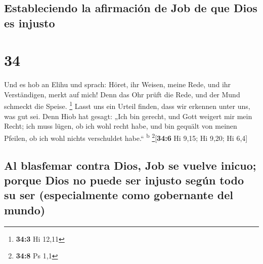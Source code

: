 \hypertarget{estableciendo-la-afirmaciuxf3n-de-job-de-que-dios-es-injusto}{%
\subsection{Estableciendo la afirmación de Job de que Dios es
injusto}\label{estableciendo-la-afirmaciuxf3n-de-job-de-que-dios-es-injusto}}

\hypertarget{section-33}{%
\section{34}\label{section-33}}

 Und es hob an Elihu und sprach:  Höret, ihr
Weisen, meine Rede, und ihr Verständigen, merkt auf mich! 
Denn das Ohr prüft die Rede, und der Mund schmeckt die Speise.
\footnote{\textbf{34:3} Hi 12,11}  Lasst uns ein Urteil
finden, dass wir erkennen unter uns, was gut sei.  Denn
Hiob hat gesagt: „Ich bin gerecht, und Gott weigert mir mein Recht;
 ich muss lügen, ob ich wohl recht habe, und bin gequält
von meinen Pfeilen, ob ich wohl nichts verschuldet habe.``
\textsuperscript{b} \footnote{\textbf{34:8} Ps 1,1}{[}\textbf{34:6} Hi
9,15; Hi 9,20; Hi 6,4{]}

\hypertarget{al-blasfemar-contra-dios-job-se-vuelve-inicuo-porque-dios-no-puede-ser-injusto-seguxfan-todo-su-ser-especialmente-como-gobernante-del-mundo}{%
\subsection{Al blasfemar contra Dios, Job se vuelve inicuo; porque Dios
no puede ser injusto según todo su ser (especialmente como gobernante
del
mundo)}\label{al-blasfemar-contra-dios-job-se-vuelve-inicuo-porque-dios-no-puede-ser-injusto-seguxfan-todo-su-ser-especialmente-como-gobernante-del-mundo}}

